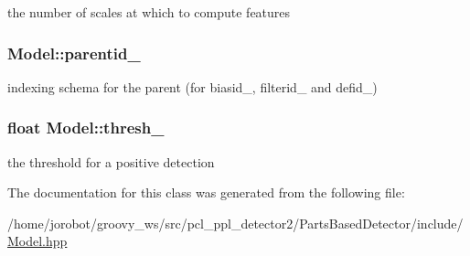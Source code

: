 the number of scales at which to compute features 

\hypertarget{classModel_a4e1151fe7911f52ec75944eff1b257f4}{
\subsubsection[{parentid\-\_\-}]{ {\bf \-Model\-::parentid\-\_\-}}}\label{classModel_a4e1151fe7911f52ec75944eff1b257f4}


indexing schema for the parent (for biasid\-\_\-, filterid\-\_\- and defid\-\_\-) 

\hypertarget{classModel_ac2263c14bbd27a5fed433494354e2b02}{
\subsubsection[{thresh\-\_\-}]{\setlength{\rightskip}{0pt plus 5cm}float {\bf \-Model\-::thresh\-\_\-}}}\label{classModel_ac2263c14bbd27a5fed433494354e2b02}


the threshold for a positive detection 



\-The documentation for this class was generated from the following file\-:\begin{DoxyCompactItemize}
\item 
/home/jorobot/groovy\-\_\-ws/src/pcl\-\_\-ppl\-\_\-detector2/\-Parts\-Based\-Detector/include/\hyperlink{Model_8hpp}{\-Model.\-hpp}\end{DoxyCompactItemize}
